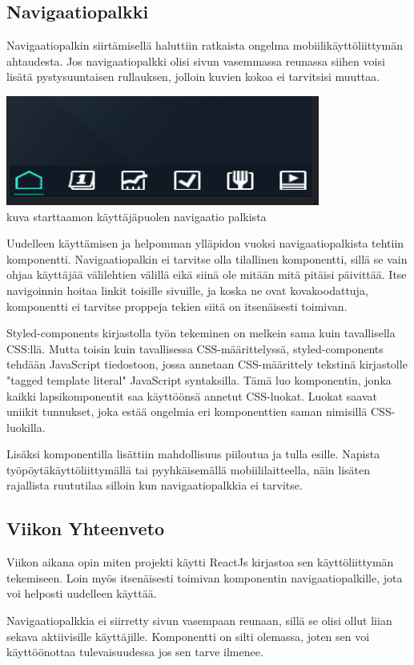\subsection*{ Navigaatiopalkki }

Navigaatiopalkin siirtämisellä haluttiin ratkaista ongelma mobiilikäyttöliittymän ahtaudesta. Jos navigaatiopalkki olisi sivun vasemmassa reunassa siihen voisi lisätä pystysuuntaisen rullauksen, jolloin kuvien kokoa ei tarvitsisi muuttaa.
\medskip



\includegraphics{src/public/starttaamohomenavbar.png} \\
kuva starttaamon käyttäjäpuolen navigaatio palkista \medskip

Uudelleen käyttämisen ja helpomman ylläpidon vuoksi navigaatiopalkista tehtiin komponentti.
Navigaatiopalkin ei tarvitse olla tilallinen komponentti, sillä se vain ohjaa käyttäjää välilehtien välillä eikä siinä ole mitään mitä pitäisi päivittää.
Itse navigoinnin hoitaa linkit toisille sivuille, ja koska ne ovat kovakoodattuja, komponentti ei tarvitse proppeja tekien siitä on itsenäisesti toimivan. 
\medskip


Styled-components kirjastolla työn tekeminen on melkein sama kuin tavallisella CSS:llä. Mutta toisin kuin tavallisessa CSS-määrittelyssä, styled-components tehdään JavaScript tiedostoon, jossa annetaan CSS-määrittely tekstinä kirjastolle "tagged template literal" JavaScript syntaksilla.
Tämä luo komponentin, jonka kaikki lapsikomponentit saa käyttöönsä annetut CSS-luokat. Luokat saavat uniikit tunnukset, joka estää ongelmia eri komponenttien saman nimisillä CSS-luokilla.
\medskip

Lisäksi komponentilla lisättiin mahdollisuus piiloutua ja tulla esille. Napista työpöytäkäyttöliittymällä tai pyyhkäisemällä mobiililaitteella, näin lisäten rajallista ruututilaa silloin kun navigaatiopalkkia ei tarvitse.\medskip









\subsection*{Viikon Yhteenveto}

Viikon aikana opin miten projekti käytti ReactJs kirjastoa sen käyttöliittymän tekemiseen. 
Loin myös itsenäisesti toimivan komponentin navigaatiopalkille, jota voi helposti uudelleen käyttää.\medskip

Navigaatiopalkkia ei siirretty sivun vasempaan reunaan, sillä se olisi ollut liian sekava aktiivisille käyttäjille. 
Komponentti on silti olemassa, joten sen voi käyttöönottaa tulevaisuudessa jos sen tarve ilmenee.\medskip
